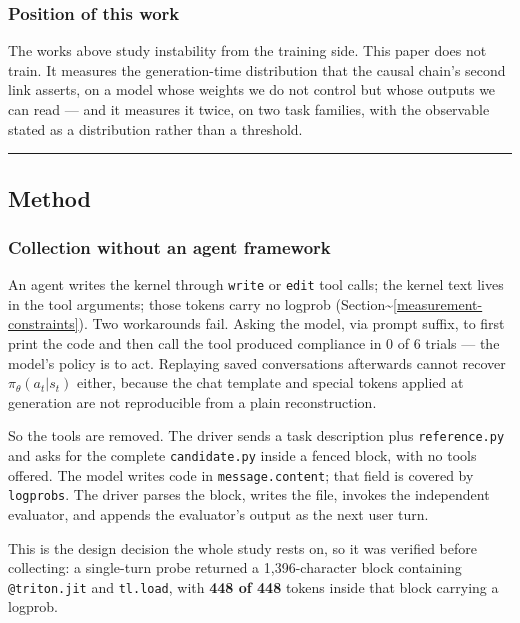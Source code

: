 \documentclass[
  11pt,
]{article}
\begin{document}
\hypertarget{position-of-this-work}{%
\subsubsection{Position of this work}\label{position-of-this-work}}

The works above study instability from the training side. This paper
does not train. It measures the generation-time distribution that the
causal chain's second link asserts, on a model whose weights we do not
control but whose outputs we can read --- and it measures it twice, on
two task families, with the observable stated as a distribution rather
than a threshold.

\begin{center}\rule{0.5\linewidth}{0.5pt}\end{center}

\hypertarget{method}{%
\subsection{Method}\label{method}}

\hypertarget{collection-without-an-agent-framework}{%
\subsubsection{Collection without an agent
framework}\label{collection-without-an-agent-framework}}

An agent writes the kernel through \texttt{write} or \texttt{edit} tool
calls; the kernel text lives in the tool arguments; those tokens carry
no logprob (Section\textasciitilde{}\ref{measurement-constraints}). Two
workarounds fail. Asking the model, via prompt suffix, to first print
the code and then call the tool produced compliance in 0 of 6 trials ---
the model's policy is to act. Replaying saved conversations afterwards
cannot recover \(\pi_\theta(a_t|s_t)\) either, because the chat template
and special tokens applied at generation are not reproducible from a
plain reconstruction.

So the tools are removed. The driver sends a task description plus
\texttt{reference.py} and asks for the complete \texttt{candidate.py}
inside a fenced block, with no tools offered. The model writes code in
\texttt{message.content}; that field is covered by \texttt{logprobs}.
The driver parses the block, writes the file, invokes the independent
evaluator, and appends the evaluator's output as the next user turn.

This is the design decision the whole study rests on, so it was verified
before collecting: a single-turn probe returned a 1,396-character block
containing \texttt{@triton.jit} and \texttt{tl.load}, with \textbf{448
of 448} tokens inside that block carrying a logprob.
\end{document}
